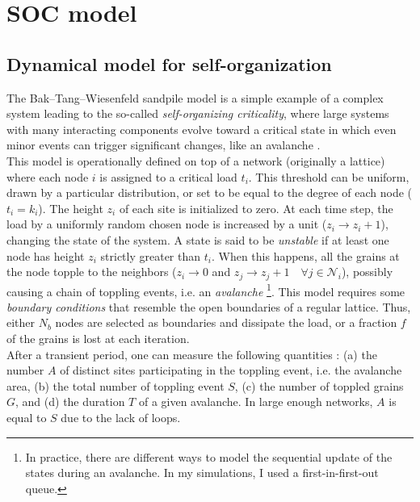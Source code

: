 \chapter{SOC model}
\label{ch:SOC}

\section{Dynamical model for self-organization}
 The Bak–Tang–Wiesenfeld sandpile model is a simple example of a complex system leading to the so-called \emph{self-organizing criticality}, where large systems with many interacting components evolve toward a critical state in which even minor events can trigger significant changes, like an avalanche \cite{bak1987self}. \\
 This model is operationally defined on top of a network (originally a lattice) where each node $i$ is assigned to a critical load $t_i$. This threshold can be uniform, drawn by a particular distribution, or set to be equal to the degree of each node ($t_i=k_i$). The height $z_i$ of each site is initialized to zero. At each time step, the load by a uniformly random chosen node is increased by a unit ($z_i \to z_i+1$), changing the state of the system. A state is said to be \emph{unstable} if at least one node has height $z_i$ strictly greater than $t_i$. When this happens, all the grains at the node topple to the neighbors ($z_i \to 0$ and $z_j \to z_j + 1 \quad \forall j \in \mathcal{N}_i$), possibly causing a chain of toppling events, i.e. an \emph{avalanche} \footnote{In practice, there are different ways to model the sequential update of the states during an avalanche. In my simulations, I used a first-in-first-out queue.}. This model requires some \emph{boundary conditions} that resemble the open boundaries of a regular lattice. Thus, either $N_b$ nodes are selected as boundaries and dissipate the load, or a fraction $f$ of the grains is lost at each iteration. \\
 After a transient period, one can measure the following quantities \cite{goh2003sandpile}: (a) the number $A$ of distinct sites participating in the toppling event, i.e. the avalanche area, (b) the total number of toppling event $S$, (c) the number of toppled grains $G$, and (d) the duration $T$ of a given avalanche. In large enough networks, $A$ is equal to $S$ due to the lack of loops. \\
